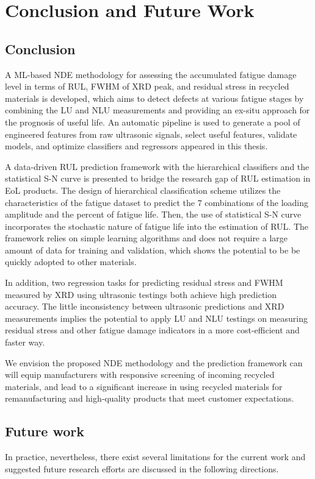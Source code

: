 \chapter{Conclusion and Future Work}
\label{chap: concl}

\section{Conclusion}
A ML-based NDE methodology for assessing the accumulated fatigue damage level in terms of RUL, FWHM of XRD peak, and residual stress in recycled materials is developed, which aims to detect defects at various fatigue stages by combining the LU and NLU measurements and providing an ex-situ approach for the prognosis of useful life. An automatic pipeline is used to generate a pool of engineered features from raw ultrasonic signals, select useful features, validate models, and optimize classifiers and regressors appeared in this thesis. 

A data-driven RUL prediction framework with the hierarchical classifiers and the statistical S-N curve is presented to bridge the research gap of RUL estimation in EoL products. The design of hierarchical classification scheme utilizes the characteristics of the fatigue dataset to predict the 7 combinations of the loading amplitude and the percent of fatigue life. Then, the use of statistical S-N curve incorporates the stochastic nature of fatigue life into the estimation of RUL. The framework relies on simple learning algorithms and does not require a large amount of data for training and validation, which shows the potential to be be quickly adopted to other materials.

In addition, two regression tasks for predicting residual stress and FWHM measured by XRD using ultrasonic testings both achieve high prediction accuracy. The little inconsistency between ultrasonic predictions and XRD measurements implies the potential to apply LU and NLU testings on measuring residual stress and other fatigue damage indicators in a more cost-efficient and faster way.

We envision the proposed NDE methodology and the prediction framework can will equip manufacturers with responsive screening of incoming recycled materials, and lead to a significant increase in using recycled materials for remanufacturing and high‐quality products that meet customer expectations.

\section{Future work}
In practice, nevertheless, there exist several limitations for the current work and suggested future research efforts are discussed in the following directions.


